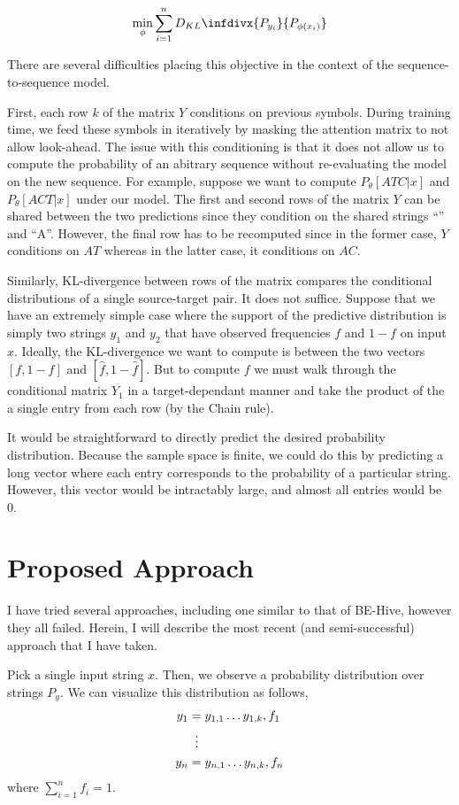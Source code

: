 \documentclass[12pt]{article}
\newcommand{\kld}[2]{\ensuremath{D_{KL}\infdivx{#1}{#2}}\xspace}
\begin{document}
$$\min_{\phi}\sum_{i=1}^n\kld{P_{y_i}}{P_{\phi(x_i)}}$$

There are several difficulties placing this objective in the context
of the sequence-to-sequence model.

First, each row $k$ of the matrix $Y$ conditions on previous
symbols. During training time, we feed these symbols in iteratively by
masking the attention matrix to not allow look-ahead. The issue with
this conditioning is that it does not allow us to compute the
probability of an abitrary sequence without re-evaluating the model on
the new sequence. For example, suppose we want to compute
$P_\theta[ATC | x]$ and $P_\theta[ACT | x]$ under our model. The first
and second rows of the matrix $Y$ can be shared between the two
predictions since they condition on the shared strings ``'' and
``A''. However, the final row has to be recomputed since in the former
case, $Y$ conditions on $AT$ whereas in the latter case, it conditions
on $AC$.

Similarly, KL-divergence between rows of the matrix compares the
conditional distributions of a single source-target pair. It does not
suffice. Suppose that we have an extremely simple case where the
support of the predictive distribution is simply two strings $y_1$ and
$y_2$ that have observed frequencies $f$ and $1-f$ on input
$x$. Ideally, the KL-divergence we want to compute is between the two
vectors $[f, 1-f]$ and $[\hat{f}, 1-\hat{f}]$. But to compute $f$ we
must walk through the conditional matrix $Y_1$ in a target-dependant
manner and take the product of the a single entry from each row (by
the Chain rule).

It would be straightforward to directly predict the desired
probability distribution. Because the sample space is finite, we could
do this by predicting a long vector where each entry corresponds to
the probability of a particular string. However, this vector would be
intractably large, and almost all entries would be 0.

\section*{Proposed Approach}

I have tried several approaches, including one similar to that of
BE-Hive, however they all failed. Herein, I will describe the most
recent (and semi-successful) approach that I have taken.

Pick a single input string $x$. Then, we observe a probability
distribution over strings $P_y$. We can visualize this distribution as
follows,
\begin{align*}
  y_1 &= y_{1,1}\ldots y_{1, k}, f_1\\
  &\;\;\vdots \notag \\
  y_n &= y_{n,1}\ldots y_{n, k}, f_n
\end{align*}
where $\sum_{i=1}^nf_i = 1$.
\end{document}
